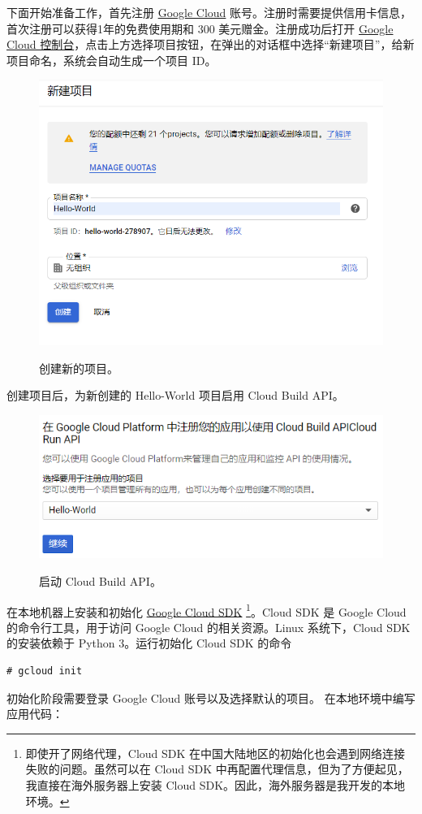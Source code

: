 \documentclass[11pt]{article}
\begin{document}
下面开始准备工作，首先注册 \href{https://cloud.google.com/}{Google Cloud} 账号。注册时需要提供信用卡信息，首次注册可以获得1年的免费使用期和 300 美元赠金。注册成功后打开 \href{https://console.cloud.google.com/}{Google Cloud 控制台}，点击上方选择项目按钮，在弹出的对话框中选择“新建项目”，给新项目命名，系统会自动生成一个项目 ID。
\begin{figure}[!htbp]
	\centering
	\includegraphics[width=0.8\linewidth]{figs/cloudrun_name.png}
	\label{}
	\caption{创建新的项目。}
\end{figure}

创建项目后，为新创建的 Hello-World 项目启用 Cloud Build API。
\begin{figure}[!htbp]
	\centering
	\includegraphics[width=0.8\linewidth]{figs/cloudrunstartapi.png}
	\label{}
	\caption{启动 Cloud Build API。}
\end{figure}

在本地机器上安装和初始化 \href{https://cloud.google.com/sdk/docs}{Google Cloud SDK} \footnote{即使开了网络代理，Cloud SDK 在中国大陆地区的初始化也会遇到网络连接失败的问题。虽然可以在 Cloud SDK 中再配置代理信息，但为了方便起见，我直接在海外服务器上安装 Cloud SDK。因此，海外服务器是我开发的本地环境。}。Cloud SDK 是 Google Cloud 的命令行工具，用于访问 Google Cloud 的相关资源。Linux 系统下，Cloud SDK 的安装依赖于 Python 3。运行初始化 Cloud SDK 的命令
\begin{lstlisting}
# gcloud init
\end{lstlisting}
初始化阶段需要登录 Google Cloud 账号以及选择默认的项目。
在本地环境中编写应用代码：

\end{document}
